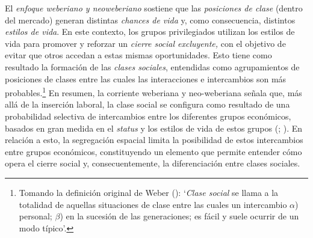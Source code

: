 \documentclass[
  spanish,
  a4paper,%
  chapterprefix=true,%
  DIV=calc,%
  twoside]{scrbook}%
\begin{document}
El \emph{enfoque weberiano y neoweberiano} sostiene que las \emph{posiciones de
clase} (dentro del mercado) generan distintas \emph{chances de vida} y, como
consecuencia, distintos \emph{estilos de vida}. En este contexto, los grupos
privilegiados utilizan los estilos de vida para promover y reforzar un
\emph{cierre social excluyente,} con el objetivo de evitar que otros accedan
a estas mismas oportunidades. Esto tiene como resultado la formación de
las \emph{clases sociales}, entendidas como agrupamientos de posiciones de
clases entre las cuales las interacciones e intercambios son más
probables.\footnote{Tomando la definición original de Weber (): `\emph{Clase social} se llama a la totalidad de aquellas
  situaciones de clase entre las cuales un intercambio \(\alpha\))
  personal; \(\beta\)) en la sucesión de las generaciones; es fácil y
  suele ocurrir de un modo típico'.} En resumen, la corriente weberiana y
neo-weberiana señala que, más allá de la inserción laboral, la clase
social se configura como resultado de una probabilidad selectiva de
intercambios entre los diferentes grupos económicos, basados en gran
medida en el \emph{status} y los estilos de vida de estos grupos (; ). En relación a esto, la segregación espacial limita la
posibilidad de estos intercambios entre grupos económicos, constituyendo
un elemento que permite entender cómo opera el cierre social y,
consecuentemente, la diferenciación entre clases sociales.
\end{document}
